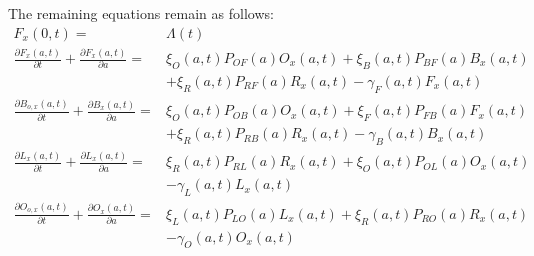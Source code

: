\documentclass{article}
\begin{document}
The remaining equations remain as follows: 
%
\begin{equation}\begin{array}{rl}
F_{x}(0,t) =& \Lambda(t) \\
%
\frac{\partial F_{x}(a,t)}{\partial t} + \frac{\partial
F_{x}(a,t)}{\partial a} =&
\xi_O(a,t) P_{OF}(a) O_x(a,t)
+ \xi_B(a,t) P_{BF}(a) B_x(a,t)\\ &
 + \xi_R(a,t) P_{RF}(a) R_x(a,t)
- \gamma_F(a,t) F_{x}(a,t)\\
%
%
\frac{\partial B_{o,x}(a,t)}{\partial t} + \frac{\partial
B_{x}(a,t)}{\partial a} =&  \xi_O(a,t) P_{OB}(a) O_x(a,t) +
\xi_F(a,t) P_{FB}(a) F_x(a,t)\\ &
+ \xi_R(a,t) P_{RB}(a) R_x(a,t) 
- \gamma_B(a,t) B_{x}(a,t)\\
%

\frac{\partial L_{x} (a,t)}{\partial t} + \frac{\partial
L_{x} (a,t)}{\partial a} =& \xi_R(a,t) P_{RL}(a) R_x(a,t) +
\xi_O(a,t) P_{OL}(a) O_x(a,t) \\&
- \gamma_L(a,t) L_{x}(a,t)
\\
%
\frac{\partial O_{o,x}(a,t)}{\partial t} + \frac{\partial
O_{x}(a,t)}{\partial a} =& \xi_L(a,t) P_{LO}(a) L_x(a,t)
+ \xi_R(a,t) P_{RO}(a) R_x(a,t)
\\&
- \gamma_O(a,t) O_{x}(a,t)
\\
%
\end{array}\end{equation}
%
\end{document}
